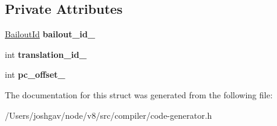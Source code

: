 \subsection*{Private Attributes}
\begin{DoxyCompactItemize}
\item 
\hyperlink{classv8_1_1internal_1_1_bailout_id}{Bailout\+Id} {\bfseries bailout\+\_\+id\+\_\+}\hypertarget{structv8_1_1internal_1_1compiler_1_1_code_generator_1_1_deoptimization_state_a0dee4ed912d06514323141028203816d}{}\label{structv8_1_1internal_1_1compiler_1_1_code_generator_1_1_deoptimization_state_a0dee4ed912d06514323141028203816d}

\item 
int {\bfseries translation\+\_\+id\+\_\+}\hypertarget{structv8_1_1internal_1_1compiler_1_1_code_generator_1_1_deoptimization_state_aa2bd079fa9238acbd0d0cc926b4b2b71}{}\label{structv8_1_1internal_1_1compiler_1_1_code_generator_1_1_deoptimization_state_aa2bd079fa9238acbd0d0cc926b4b2b71}

\item 
int {\bfseries pc\+\_\+offset\+\_\+}\hypertarget{structv8_1_1internal_1_1compiler_1_1_code_generator_1_1_deoptimization_state_ac6b2129ae1411fd8352884298b22df6d}{}\label{structv8_1_1internal_1_1compiler_1_1_code_generator_1_1_deoptimization_state_ac6b2129ae1411fd8352884298b22df6d}

\end{DoxyCompactItemize}


The documentation for this struct was generated from the following file\+:\begin{DoxyCompactItemize}
\item 
/\+Users/joshgav/node/v8/src/compiler/code-\/generator.\+h\end{DoxyCompactItemize}
